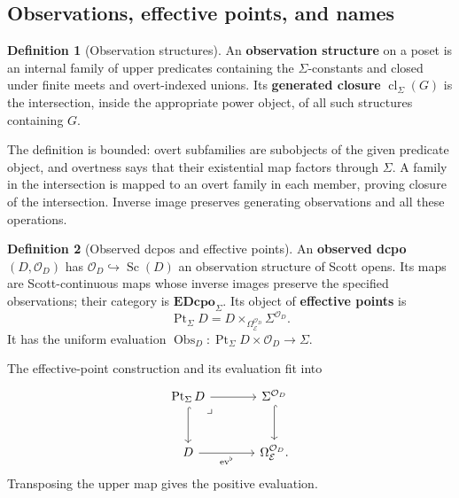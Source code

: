 \documentclass[11pt,a4paper]{article}
\numberwithin{algorithm}{section}
\numberwithin{equation}{section}
\theoremstyle{definition}
\newtheorem{definition}[definition]{Definition}
\theoremstyle{remark}
\theoremstyle{plain}
\newcommand{\E}{\mathcal E}
\newcommand{\Truth}{\Omega_{\E}}
\newcommand{\OO}{\mathcal O}
\newcommand{\Sc}{\operatorname{Sc}}
\newcommand{\Pt}{\operatorname{Pt}_{\Sigma}}
\newcommand{\ED}{\mathbf{EDcpo}_{\Sigma}}
\newcommand{\incl}{\hookrightarrow}
\newcommand{\cl}{\operatorname{cl}}
\theoremstyle{definition}
\theoremstyle{plain}
\begin{document}
\subsection{Observations, effective points, and names}
\label{sec:standalone-observations}


\begin{definition}[Observation structures]\label{def:observation-structures}
An \textbf{observation structure} on a poset is an internal family of upper
predicates containing the $\Sigma$-constants and closed under finite
meets and overt-indexed unions. Its \textbf{generated closure}
$\cl_\Sigma(G)$ is the intersection, inside the appropriate power
object, of all such structures containing $G$.
\end{definition}


The definition is bounded: overt subfamilies are subobjects of the
given predicate object, and overtness says that their existential
map factors through $\Sigma$.
A family in the intersection is mapped to an overt family in each
member, proving closure of the intersection.
Inverse image preserves generating observations and all these
operations.


\begin{definition}[Observed dcpos and effective points]\label{def:observed-dcpos}
An \textbf{observed dcpo} $(D,\OO_D)$ has $\OO_D\incl\Sc(D)$ an observation
structure of Scott opens. Its maps are Scott-continuous maps whose
inverse images preserve the specified observations; their category
is $\ED$. Its object of \textbf{effective points} is
\begin{equation}\label{eq:standalone-points}
 \Pt D=D\times_{\Truth^{\OO_D}}\Sigma^{\OO_D}.
\end{equation}
It has the uniform evaluation $\operatorname{Obs}_D:\Pt D\times\OO_D
\to\Sigma$.
\end{definition}


The effective-point construction and its evaluation fit into
\[
\begin{tikzcd}[column sep=large,row sep=large]
 \Pt D \arrow[dr,phantom,"\lrcorner",very near start] \arrow[r] \arrow[d,hook]
   & \Sigma^{\OO_D} \arrow[d,hook]\\
 D \arrow[r,"{\mathrm{ev}^{\flat}}"'] & \Truth^{\OO_D}.
\end{tikzcd}
\]
Transposing the upper map gives the positive evaluation.
\end{document}
